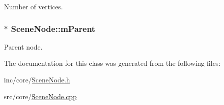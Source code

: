 Number of vertices. 

\hypertarget{class_scene_node_aa478ebb376c411801a004bcc2590046d}{
\subsubsection[{m\+Parent}]{$\ast$ Scene\+Node\+::m\+Parent\hspace{0.3cm}{\ttfamily [private]}}}\label{class_scene_node_aa478ebb376c411801a004bcc2590046d}


Parent node. 



The documentation for this class was generated from the following files\+:\begin{DoxyCompactItemize}
\item 
inc/core/\hyperlink{_scene_node_8h}{Scene\+Node.\+h}\item 
src/core/\hyperlink{_scene_node_8cpp}{Scene\+Node.\+cpp}\end{DoxyCompactItemize}

